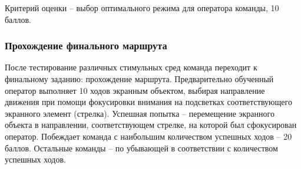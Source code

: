Критерий оценки – выбор оптимального режима для оператора команды, 10 баллов.

\subsubsection*{Прохождение финального маршрута}

После тестирование различных стимульных сред команда переходит к финальному заданию: прохождение маршрута. Предварительно обученный оператор выполняет 10 ходов экранным объектом, выбирая направление движения при помощи фокусировки внимания на подсветках соответствующего экранного элемент (стрелка). Успешная попытка – перемещение экранного объекта в направлении, соответствующем стрелке, на которой был сфокусирован оператор. Побеждает команда с наибольшим количеством успешных ходов – 20 баллов. Остальные команды – по убывающей в соответствии с количеством успешных ходов.